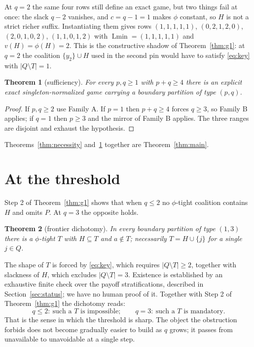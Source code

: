 \documentclass[11pt]{article}
\newtheorem{theorem}{Theorem}
\newcommand{\Lmin}{\operatorname{Lmin}}
\begin{document}
At $q=2$ the same four rows still define an exact game, but two things fail at
once: the slack $q-2$ vanishes, and $c=q-1=1$ makes $\phi$ constant, so $H$ is
not a strict richer suffix.  Instantiating them gives rows $(1,1,1,1,1)$,
$(0,2,1,2,0)$, $(2,0,1,0,2)$, $(1,1,0,1,2)$ with $\Lmin=(1,1,1,1,1)$ and
$v(H)=\phi(H)=2$.  This is the constructive shadow of Theorem~\ref{thm:g1}: at
$q=2$ the coalition $\{y_2\}\cup H$ used in the second pin would have to
satisfy \eqref{eq:key} with $|Q\setminus T|=1$.

\begin{theorem}[sufficiency]\label{thm:sufficiency}
For every $p,q\ge1$ with $p+q\ge4$ there is an explicit exact
singleton-normalized game carrying a boundary partition of type $(p,q)$.
\end{theorem}

\begin{proof}
If $p,q\ge2$ use Family A.  If $p=1$ then $p+q\ge4$ forces $q\ge3$, so Family B
applies; if $q=1$ then $p\ge3$ and the mirror of Family B applies.  The three
ranges are disjoint and exhaust the hypothesis.
\end{proof}

Theorems~\ref{thm:necessity} and~\ref{thm:sufficiency} together are
Theorem~\ref{thm:main}.

\section{At the threshold}\label{sec:frontier}

Step 2 of Theorem~\ref{thm:g1} shows that when $q\le2$ no $\phi$-tight
coalition contains $H$ and omits $P$.  At $q=3$ the opposite holds.

\begin{theorem}[frontier dichotomy]\label{thm:g4}
In every boundary partition of type $(1,3)$ there is a $\phi$-tight $T$ with
$H\subseteq T$ and $a\notin T$; necessarily $T=H\cup\{j\}$ for a single
$j\in Q$.
\end{theorem}

The shape of $T$ is forced by \eqref{eq:key}, which requires
$|Q\setminus T|\ge2$, together with slackness of $H$, which excludes
$|Q\setminus T|=3$.  Existence is established by an exhaustive finite check
over the payoff stratifications, described in Section~\ref{sec:status}; we have
no human proof of it.  Together with Step 2 of Theorem~\ref{thm:g1} the
dichotomy reads:
\[
 q\le2:\ \text{such a }T\text{ is impossible};\qquad
 q=3:\ \text{such a }T\text{ is mandatory}.
\]
That is the sense in which the threshold is sharp.  The object the obstruction
forbids does not become gradually easier to build as $q$ grows; it passes from
unavailable to unavoidable at a single step.
\end{document}
